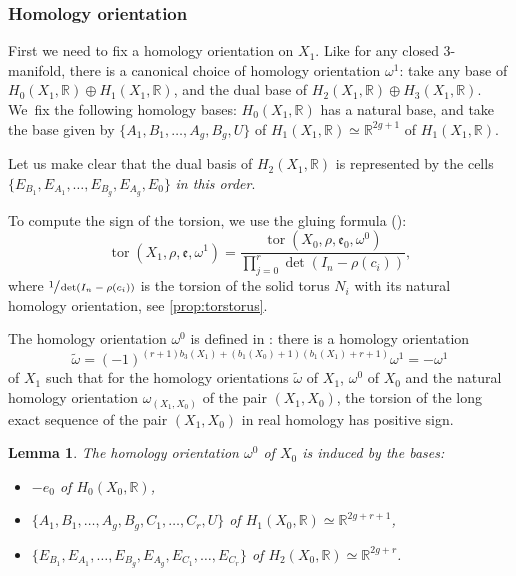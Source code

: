 \documentclass[10pt]{amsart}
\theoremstyle{plain}
\newtheorem{lem}[thm]{Lemma}
\theoremstyle{definition}
\theoremstyle{remark}
\newcommand{\R}{\mathbb{R}}
\numberwithin{equation}{section}
\DeclareMathOperator{\tor}{tor}
\begin{document}
\label{subsubsec:sign}

\subsubsection*{Homology orientation}
First we need to fix a homology orientation on $X_1$. Like for any closed 3\nobreakdash-manifold, there is a canonical choice of homology orientation $\omega^1$: take any base of $H_0(X_1, \R) \oplus H_1(X_1, \R)$, and the dual base of $H_2(X_1, \R) \oplus H_3(X_1, \R)$.
We~fix the following homology bases:
$H_0(X_1, \R)$ has a natural base, and take the base given by $\{A_1, B_1, \ldots, A_g, B_g, U\}$ of $H_1(X_1, \R) \simeq \R^{2g+1}$ of $H_1(X_1, \R)$.

Let us make clear that the dual basis of $H_2(X_1, \R)$ is represented by the cells
$\{ E_{B_1}, E_{A_1}, \ldots, E_{B_g}, E_{A_g}, E_0\}$ \emph{in this order}.

To compute the sign of the torsion, we use the gluing formula (\cite[Th.\,VII.1.4]{Turaev_tors}):
\begin{equation}
\label{eq:TurGlue}
\tor(X_1, \rho, \mathfrak e, \omega^1) = \frac { \tor (X_0, \rho, \mathfrak e_0, \omega^0)}{\prod_{j=0}^r \det(I_n-\rho(c_i))},
\end{equation}
where $\sfrac 1 {\det(I_n-\rho(c_i))}$ is the torsion of the solid torus $N_i$ with its natural homology orientation, see \cref{prop:torstorus}.

The homology orientation $\omega^0$ is defined in \cite[\S V.2]{Turaev_tors}: there is a homology orientation
\[
\widetilde \omega = (-1)^{(r+1)b_3(X_1) + (b_1(X_0)+1)(b_1(X_1)+r+1)} \omega^1 = - \omega^1
\]
of $X_1$
such that for the homology orientations $\widetilde \omega$ of $X_1$, $\omega^0$ of $X_0$ and the natural homology orientation $\omega_{(X_1, X_0)}$ of the pair $(X_1, X_0)$, the torsion of the long exact sequence of the pair $(X_1,X_0)$ in real homology has positive sign.

\begin{lem}
The homology orientation $\omega^0$ of $X_0$ is induced by the bases:
\begin{itemize}
\item
$-e_0$ of $H_0(X_0, \R)$,
\item
$\{A_1, B_1, \ldots, A_g, B_g, C_1, \ldots, C_r, U \}$ of $H_1(X_0, \R) \simeq \R^{2g+r+1}$,
\item
$\{ E_{B_1}, E_{A_1}, \ldots, E_{B_g}, E_{A_g}, E_{C_1}, \ldots, E_{C_r}\}$ of $H_2(X_0, \R) \simeq \R^{2g+r}$.
\end{itemize}
\end{lem}
\end{document}
